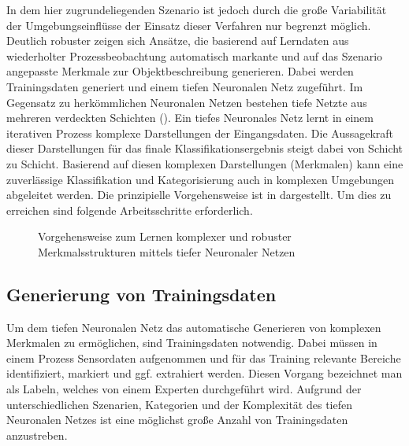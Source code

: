 In dem hier zugrundeliegenden Szenario ist jedoch durch die große Variabilität der Umgebungseinflüsse der Einsatz dieser Verfahren nur begrenzt möglich. Deutlich robuster zeigen sich Ansätze, die basierend auf Lerndaten aus wiederholter Prozessbeobachtung  automatisch markante und auf das Szenario angepasste Merkmale zur Objektbeschreibung generieren. Dabei werden Trainingsdaten generiert und einem tiefen Neuronalen Netz zugeführt. Im Gegensatz zu herkömmlichen Neuronalen Netzen bestehen tiefe Netzte aus mehreren verdeckten Schichten (). Ein tiefes Neuronales Netz lernt in einem iterativen Prozess komplexe Darstellungen der Eingangsdaten. Die Aussagekraft dieser Darstellungen für das finale Klassifikationsergebnis steigt dabei von Schicht zu Schicht. Basierend auf diesen komplexen Darstellungen (Merkmalen) kann eine zuverlässige Klassifikation und Kategorisierung auch in komplexen Umgebungen abgeleitet werden. Die prinzipielle Vorgehensweise ist in  dargestellt. Um dies zu erreichen sind folgende Arbeitsschritte erforderlich.

\begin{figure}[htbp]
    \centering
    \caption{\label{fig-deep-nn}Vorgehensweise zum Lernen komplexer und robuster Merkmalsstrukturen mittels tiefer Neuronaler Netzen}
\end{figure}

\subsection{Generierung von Trainingsdaten}
Um dem tiefen Neuronalen Netz das automatische Generieren von komplexen Merkmalen zu ermöglichen, sind Trainingsdaten notwendig. Dabei müssen in einem Prozess Sensordaten aufgenommen und für das Training relevante Bereiche identifiziert, markiert und ggf. extrahiert werden. Diesen Vorgang bezeichnet man als Labeln, welches von einem Experten durchgeführt wird. Aufgrund der unterschiedlichen Szenarien, Kategorien und der Komplexität des tiefen Neuronalen Netzes ist eine möglichst große Anzahl von Trainingsdaten anzustreben.

